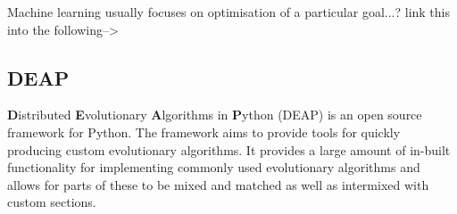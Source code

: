 \documentclass{article}
\begin{document}
Machine learning usually focuses on optimisation of a particular goal...? link this into the following-->

\subsection{DEAP}
\textbf{D}istributed \textbf{E}volutionary \textbf{A}lgorithms in \textbf{P}ython (DEAP) is an open source framework for Python\cite{deap}. The framework aims to provide tools for quickly producing custom evolutionary algorithms. It provides a large amount of in-built functionality for implementing commonly used evolutionary algorithms and allows for parts of these to be mixed and matched as well as intermixed with custom sections.
\end{document}
